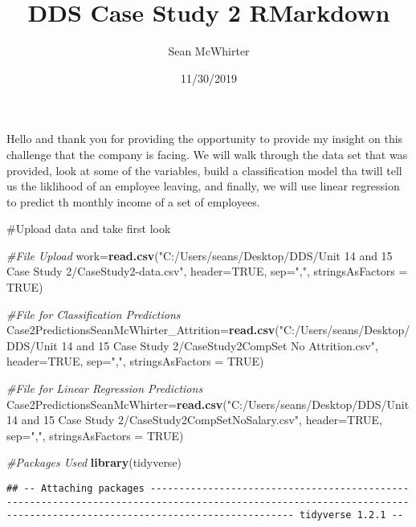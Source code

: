 \documentclass[]{article}
\title{DDS Case Study 2 RMarkdown}
\author{Sean McWhirter}
\date{11/30/2019}
\newenvironment{Shaded}{\begin{snugshade}}{\end{snugshade}}
\newcommand{\CommentTok}[1]{\textcolor[rgb]{0.56,0.35,0.01}{\textit{#1}}}
\newcommand{\DataTypeTok}[1]{\textcolor[rgb]{0.13,0.29,0.53}{#1}}
\newcommand{\KeywordTok}[1]{\textcolor[rgb]{0.13,0.29,0.53}{\textbf{#1}}}
\newcommand{\NormalTok}[1]{#1}
\newcommand{\OtherTok}[1]{\textcolor[rgb]{0.56,0.35,0.01}{#1}}
\newcommand{\StringTok}[1]{\textcolor[rgb]{0.31,0.60,0.02}{#1}}
\begin{document}
\maketitle

Hello and thank you for providing the opportunity to provide my insight
on this challenge that the company is facing. We will walk through the
data set that was provided, look at some of the variables, build a
classification model tha twill tell us the liklihood of an employee
leaving, and finally, we will use linear regression to predict th
monthly income of a set of employees.

\#Upload data and take first look

\begin{Shaded}
\begin{Highlighting}[]
\CommentTok{#File Upload}
\NormalTok{work=}\KeywordTok{read.csv}\NormalTok{(}\StringTok{"C:/Users/seans/Desktop/DDS/Unit 14 and 15 Case Study 2/CaseStudy2-data.csv"}\NormalTok{, }\DataTypeTok{header=}\OtherTok{TRUE}\NormalTok{, }\DataTypeTok{sep=}\StringTok{","}\NormalTok{, }\DataTypeTok{stringsAsFactors =} \OtherTok{TRUE}\NormalTok{)}

\CommentTok{#File for Classification Predictions}
\NormalTok{Case2PredictionsSeanMcWhirter_Attrition=}\KeywordTok{read.csv}\NormalTok{(}\StringTok{"C:/Users/seans/Desktop/DDS/Unit 14 and 15 Case Study 2/CaseStudy2CompSet No Attrition.csv"}\NormalTok{, }\DataTypeTok{header=}\OtherTok{TRUE}\NormalTok{, }\DataTypeTok{sep=}\StringTok{","}\NormalTok{, }\DataTypeTok{stringsAsFactors =} \OtherTok{TRUE}\NormalTok{)}

\CommentTok{#File for Linear Regression Predictions}
\NormalTok{Case2PredictionsSeanMcWhirter=}\KeywordTok{read.csv}\NormalTok{(}\StringTok{"C:/Users/seans/Desktop/DDS/Unit 14 and 15 Case Study 2/CaseStudy2CompSetNoSalary.csv"}\NormalTok{, }\DataTypeTok{header=}\OtherTok{TRUE}\NormalTok{, }\DataTypeTok{sep=}\StringTok{","}\NormalTok{, }\DataTypeTok{stringsAsFactors =} \OtherTok{TRUE}\NormalTok{)}

\CommentTok{#Packages Used}
\KeywordTok{library}\NormalTok{(tidyverse)}
\end{Highlighting}
\end{Shaded}

\begin{verbatim}
## -- Attaching packages --------------------------------------------------------------------------------------------------------------------------------------------------------------------- tidyverse 1.2.1 --
\end{verbatim}
\end{document}
